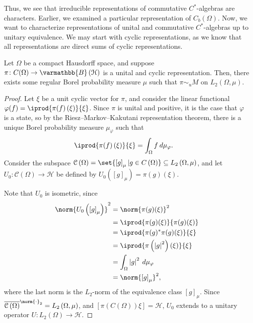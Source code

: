\documentclass[10pt]{mypackage}
\renewcommand*{\mathbb}[1]{\varmathbb{#1}}
\newcommand{\B}{\mathbb{B}}
\begin{document}
Thus, we see that irreducible representations of commutative $C^{\ast}$-algebras are characters. Earlier, we examined a particular representation of $C_{b}\left(\Omega\right)$. Now, we want to characterize representations of unital and commutative $C^{\ast}$-algebras up to unitary equivalence. We may start with cyclic representations, as we know that all representations are direct sums of cyclic representations.
\begin{proposition}
  Let $\Omega$ be a compact Hausdorff space, and suppose $\pi\colon C(\Omega)\rightarrow \B\left(\mathcal{H}\right)$ is a unital and cyclic representation. Then, there exists some regular Borel probability measure $\mu$ such that $\pi\sim_{u} M$ on $L_2\left(\Omega,\mu\right)$.
\end{proposition}
\begin{proof}
  Let $\xi$ be a unit cyclic vector for $\pi$, and consider the linear functional $\varphi(f) = \iprod{\pi(f)\left(\xi\right)}{\xi}$. Since $\pi$ is unital and positive, it is the case that $\varphi$ is a state, so by the Riesz--Markov--Kakutani representation theorem, there is a unique Borel probability measure $\mu_{\varphi}$ such that
  \begin{align*}
    \iprod{\pi(f)\left(\xi\right)}{\xi} &= \int_{\Omega}^{} f\:d\mu_{\varphi}.
  \end{align*}
  Consider the subspace $\mathcal{C}\left(\Omega\right) = \set{\left[g\right]_{\mu} | g\in C\left(\Omega\right)}\subseteq L_2\left(\Omega,\mu\right)$, and let $U_0\colon \mathcal{C}\left(\Omega\right)\rightarrow \mathcal{H}$ be defined by $U_0\left(\left[g\right]_{\mu}\right) = \pi(g)\left(\xi\right)$.\newline

  Note that $U_0$ is isometric, since
  \begin{align*}
    \norm{U_0\left(\left[g\right]_{\mu}\right)}^2 &= \norm{\pi(g)(\xi)}^2\\
                                                  &= \iprod{\pi(g)(\xi)}{\pi(g)(\xi)}\\
                                                  &= \iprod{\pi(g)^{\ast}\pi(g)(\xi)}{\xi}\\
                                                  &= \iprod{\pi\left(\left\vert g \right\vert^2\right)\left(\xi\right)}{\xi}\\
                                                  &= \int_{\Omega}^{} \left\vert g \right\vert^2\:d\mu_{\varphi}\\
                                                  &= \norm{\left[g\right]_{\mu}}^2,
  \end{align*}
  where the last norm is the $L_2$-norm of the equivalence class $\left[g\right]_{\mu}$. Since $\overline{\mathcal{C}\left(\Omega\right)}^{\norm{\cdot}_2} = L_2\left(\Omega,\mu\right)$, and $\left[\pi\left(C\left(\Omega\right)\right)\xi\right] = \mathcal{H}$, $U_0$ extends to a unitary operator $U\colon L_2\left(\Omega\right)\rightarrow \mathcal{H}$.\newline


\end{proof}
\end{document}
